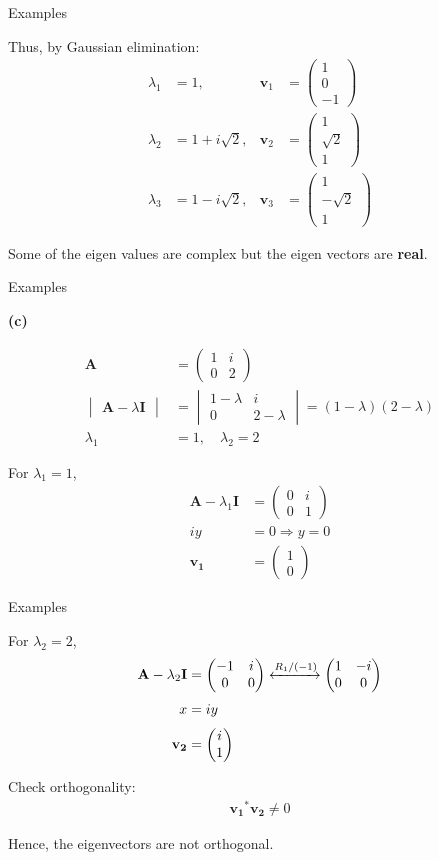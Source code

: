 \documentclass{beamer}
\numberwithin{equation}{section}
\theoremstyle{remark}
\newcommand{\myvec}[1]{\ensuremath{\begin{pmatrix}#1\end{pmatrix}}}
\newcommand{\mydet}[1]{\ensuremath{\begin{vmatrix}#1\end{vmatrix}}}
\let\vec\mathbf
\begin{document}
\begin{frame}{Examples}

Thus, by Gaussian elimination:
\begin{align}
\lambda_1 &= 1, & \vec{v}_1 &= \myvec{1\\0\\-1}\\
\lambda_2 &= 1 + i\sqrt{2}, & \vec{v}_2 &= \myvec{1\\\sqrt{2}\\1}\\
\lambda_3 &= 1 - i\sqrt{2}, & \vec{v}_3 &= \myvec{1\\-\sqrt{2}\\1}
\end{align}

Some of the eigen values are complex but the eigen vectors are \textbf{real}.

\end{frame}

\begin{frame}{Examples}

\textbf{(c)}

\begin{align}
\vec{A} &= \myvec{1 & i \\ 0 & 2} \\[2mm]
\mydet{\vec{A} - \lambda \vec{I}} 
&= \mydet{1-\lambda & i \\ 0 & 2-\lambda}
= (1-\lambda)(2-\lambda) \\[2mm]
\lambda_1 &= 1, \quad \lambda_2 = 2
\end{align}

For $\lambda_1 = 1$,
\begin{align}
\vec{A} - \lambda_1 \vec{I} &= \myvec{0 & i \\ 0 & 1} \\
i y &= 0 \Rightarrow y = 0 \\[1mm]
\vec{v_1} &= \myvec{1 \\ 0}
\end{align}

\end{frame}

\begin{frame}{Examples}

For $\lambda_2 = 2$,
\begin{align}
\vec{A} - \lambda_2 \vec{I} &= \myvec{-1 & i \\ 0 & 0}
\xleftrightarrow{R_1/(-1)}
\myvec{1 & -i \\ 0 & 0} \\[1mm]
x &= i y \\[1mm]
\vec{v_2} &= \myvec{i \\ 1}
\end{align}

Check orthogonality:
\begin{align}
\vec{v_1}^*\vec{v_2} \ne 0
\end{align}

Hence, the eigenvectors are not orthogonal.

\end{frame}
\end{document}
